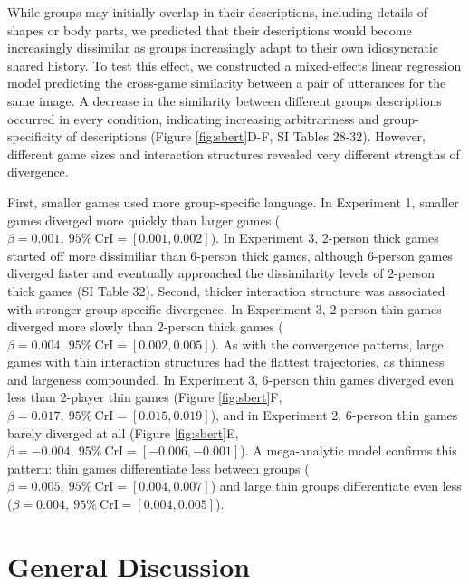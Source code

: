 \documentclass[
  english,
]{article}
\begin{document}
While groups may initially overlap in their descriptions, including details of shapes or body parts, we predicted that their descriptions would become increasingly dissimilar as groups increasingly adapt to their own idiosyncratic shared history.
To test this effect, we constructed a mixed-effects linear regression model predicting the cross-game similarity between a pair of utterances for the same image.
A decrease in the similarity between different groups descriptions occurred in every condition, indicating increasing arbitrariness and group-specificity of descriptions (Figure \ref{fig:sbert}D-F, SI Tables 28-32).
However, different game sizes and interaction structures revealed very different strengths of divergence.

First, smaller games used more group-specific language.
In Experiment 1, smaller games diverged more quickly than larger games (\(\beta=0.001,\:95\%\:\mathrm{CrI}=[0.001, 0.002]\)).
In Experiment 3, 2-person thick games started off more dissimiliar than 6-person thick games, although 6-person games diverged faster and eventually approached the dissimilarity levels of 2-person thick games (SI Table 32).
Second, thicker interaction structure was associated with stronger group-specific divergence.
In Experiment 3, 2-person thin games diverged more slowly than 2-person thick games (\(\beta=0.004,\:95\%\:\mathrm{CrI}=[0.002, 0.005]\)).
As with the convergence patterns, large games with thin interaction structures had the flattest trajectories, as thinness and largeness compounded.
In Experiment 3, 6-person thin games diverged even less than 2-player thin games (Figure \ref{fig:sbert}F, \(\beta=0.017,\:95\%\:\mathrm{CrI}=[0.015, 0.019]\)), and in Experiment 2, 6-person thin games barely diverged at all (Figure \ref{fig:sbert}E, \(\beta=-0.004,\:95\%\:\mathrm{CrI}=[-0.006, -0.001]\)).
A mega-analytic model confirms this pattern: thin games differentiate less between groups (\(\beta=0.005,\:95\%\:\mathrm{CrI}=[0.004, 0.007]\)) and large thin groups differentiate even less (\(\beta=0.004,\:95\%\:\mathrm{CrI}=[0.004, 0.005]\)).

\hypertarget{general-discussion}{%
\section{General Discussion}\label{general-discussion}}
\end{document}
